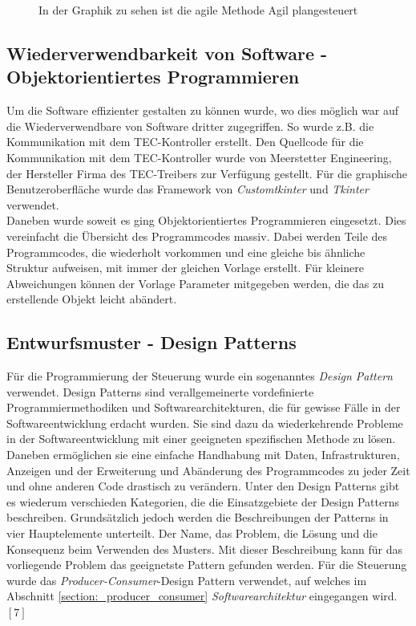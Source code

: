 \begin{figure}
    \centering
    \caption{In der Graphik zu sehen ist die agile Methode Agil plangesteuert}
    \label{fig:agile_method}
\end{figure}


\subsection{Wiederverwendbarkeit von Software - Objektorientiertes Programmieren}
Um die Software effizienter gestalten zu können wurde, wo dies möglich war auf die Wiederverwendbare von Software dritter zugegriffen. So wurde z.B. die Kommunikation mit dem TEC-Kontroller erstellt. Den Quellcode für die Kommunikation mit dem TEC-Kontroller wurde von Meerstetter Engineering, der Hersteller Firma des TEC-Treibers zur Verfügung gestellt.
Für die graphische Benutzeroberfläche wurde das Framework von \textit{Customtkinter} und \textit{Tkinter} verwendet.\\
Daneben wurde soweit es ging Objektorientiertes Programmieren eingesetzt. Dies vereinfacht die Übersicht des Programmcodes massiv. Dabei werden Teile des Programmcodes, die wiederholt vorkommen und eine gleiche bis ähnliche Struktur aufweisen, mit immer der gleichen Vorlage erstellt. Für kleinere Abweichungen können der Vorlage Parameter mitgegeben werden, die das zu erstellende Objekt leicht abändert.

\subsection{Entwurfsmuster - Design Patterns}
Für die Programmierung der Steuerung wurde ein sogenanntes \textit{Design Pattern} verwendet. Design Patterns sind verallgemeinerte vordefinierte Programmiermethodiken und Softwarearchitekturen, die für gewisse Fälle in der Softwareentwicklung erdacht wurden. Sie sind dazu da wiederkehrende Probleme in der Softwareentwicklung mit einer geeigneten spezifischen Methode zu lösen. Daneben ermöglichen sie eine einfache Handhabung mit Daten, Infrastrukturen, Anzeigen und der Erweiterung und Abänderung des Programmcodes zu jeder Zeit und ohne anderen Code drastisch zu verändern. Unter den Design Patterns gibt es wiederum verschieden Kategorien, die die Einsatzgebiete der Design Patterns beschreiben. Grundsätzlich jedoch werden die Beschreibungen der Patterns in vier Hauptelemente unterteilt. Der Name, das Problem, die Lösung und die Konsequenz beim Verwenden des Musters. Mit dieser  Beschreibung kann für das vorliegende Problem das geeignetste Pattern gefunden werden. Für die Steuerung wurde das \textit{Producer-Consumer}-Design Pattern verwendet, auf welches im Abschnitt \ref{section:_producer_consumer}  \textit{Softwarearchitektur} eingegangen wird. $[7]$

